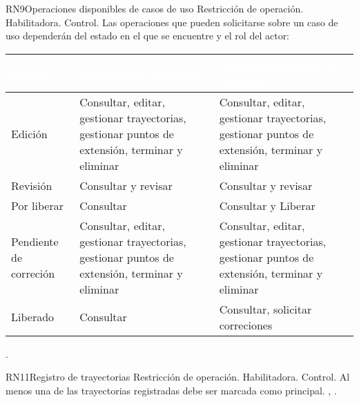 \begin{BussinesRule}{RN9}{Operaciones disponibles de casos de uso} 
	\BRitem[Tipo:] Restricción de operación. 
	\BRitem[Clase:] Habilitadora. 
	\BRitem[Nivel:] Control. %
	\BRitem[Descripción:] Las operaciones que pueden solicitarse sobre un caso de uso dependerán del estado en el que se encuentre y el rol del actor:
	
	\begin{table}[H]
		\centering
		\begin{tabular}{|p{5cm}| p{5cm}| p{5cm}|}
			\hline
			\rowcolor{blue} \textcolor{white}{\textbf{Estado}} & \textcolor{white}{\textbf{Operaciones Analista}} & \textcolor{white}{\textbf{Operaciones Líder de Análisis}} \\
			\hline
			Edición & Consultar, editar, gestionar trayectorias, gestionar puntos de extensión, terminar y eliminar & Consultar, editar, gestionar trayectorias, gestionar puntos de extensión, terminar y eliminar \\
			\hline
			Revisión & Consultar y revisar & Consultar y revisar\\
			\hline
			Por liberar & Consultar & Consultar y Liberar\\
			\hline
			Pendiente de correción & Consultar, editar, gestionar trayectorias, gestionar puntos de extensión, terminar y eliminar & Consultar, editar, gestionar trayectorias, gestionar puntos de extensión, terminar y eliminar\\
			\hline
			Liberado & Consultar & Consultar, solicitar correciones\\
			\hline
		\end{tabular}
	\end{table}

	 .
	
\end{BussinesRule}

	\begin{BussinesRule}{RN11}{Registro de trayectorias} 
		\BRitem[Tipo:] Restricción de operación. 
		\BRitem[Clase:] Habilitadora. 
		\BRitem[Nivel:] Control. %
		\BRitem[Descripción:] Al menos una de las trayectorias registradas debe ser marcada como principal.
		 , . 
	\end{BussinesRule}

